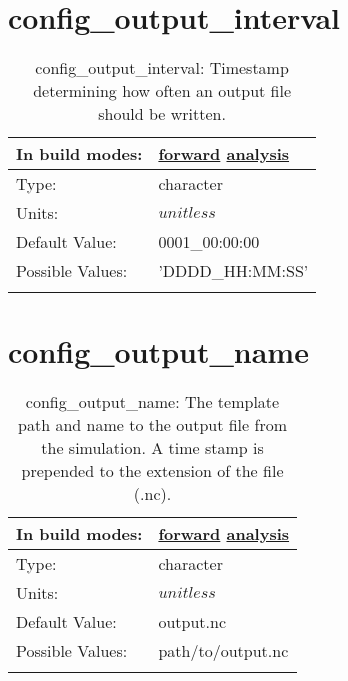 \section[config\_output\_interval]{config\_output\_interval}
\label{sec:nm_sec_config_output_interval}
\begin{center}
\begin{longtable}{| p{2.0in} || p{4.0in} |}
    \hline
    In build modes: & \hyperref[subsec:forward_nm_tab_io]{forward} \hyperref[subsec:analysis_nm_tab_io]{analysis} \\
    \hline
    Type: & character \\
    \hline
    Units: & $unitless$ \\
    \hline
    Default Value: & 0001\_00:00:00 \\
    \hline
    Possible Values: & 'DDDD\_HH:MM:SS' \\
    \hline
    \caption{config\_output\_interval: Timestamp determining how often an output file should be written.}
\end{longtable}
\end{center}
\section[config\_output\_name]{config\_output\_name}
\label{sec:nm_sec_config_output_name}
\begin{center}
\begin{longtable}{| p{2.0in} || p{4.0in} |}
    \hline
    In build modes: & \hyperref[subsec:forward_nm_tab_io]{forward} \hyperref[subsec:analysis_nm_tab_io]{analysis} \\
    \hline
    Type: & character \\
    \hline
    Units: & $unitless$ \\
    \hline
    Default Value: & output.nc \\
    \hline
    Possible Values: & path/to/output.nc \\
    \hline
    \caption{config\_output\_name: The template path and name to the output file from the simulation. A time stamp is prepended to the extension of the file (.nc).}
\end{longtable}
\end{center}
